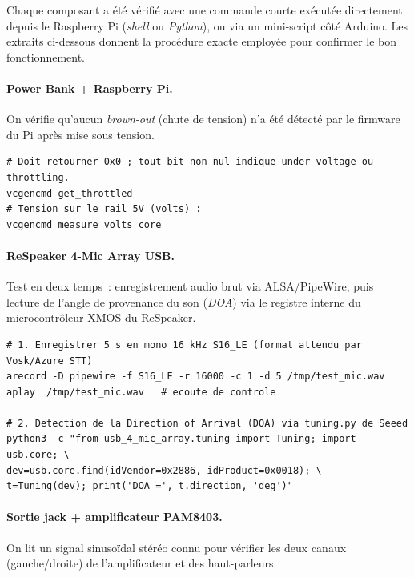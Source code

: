 \documentclass[a4paper,12pt]{report}
\begin{document}
	Chaque composant a été vérifié avec une commande courte exécutée directement
	depuis le Raspberry Pi (\textit{shell} ou \textit{Python}), ou via un mini-script
	côté Arduino. Les extraits ci-dessous donnent la procédure exacte employée pour
	confirmer le bon fonctionnement.

	\paragraph{Power Bank + Raspberry Pi.}
	On vérifie qu'aucun \textit{brown-out} (chute de tension) n'a été détecté par
	le firmware du Pi après mise sous tension.

\begin{lstlisting}[style=kodatest, language=shellkoda, caption={Diagnostic alimentation \texttt{vcgencmd}}]
# Doit retourner 0x0 ; tout bit non nul indique under-voltage ou throttling.
vcgencmd get_throttled
# Tension sur le rail 5V (volts) :
vcgencmd measure_volts core
\end{lstlisting}

	\paragraph{ReSpeaker 4-Mic Array USB.}
	Test en deux temps~: enregistrement audio brut via ALSA/PipeWire, puis lecture
	de l'angle de provenance du son (\textit{DOA}) via le registre interne du
	microcontrôleur XMOS du ReSpeaker.

\begin{lstlisting}[style=kodatest, language=shellkoda, caption={Enregistrement 5\,s et lecture du DOA}]
# 1. Enregistrer 5 s en mono 16 kHz S16_LE (format attendu par Vosk/Azure STT)
arecord -D pipewire -f S16_LE -r 16000 -c 1 -d 5 /tmp/test_mic.wav
aplay  /tmp/test_mic.wav   # ecoute de controle

# 2. Detection de la Direction of Arrival (DOA) via tuning.py de Seeed
python3 -c "from usb_4_mic_array.tuning import Tuning; import usb.core; \
dev=usb.core.find(idVendor=0x2886, idProduct=0x0018); \
t=Tuning(dev); print('DOA =', t.direction, 'deg')"
\end{lstlisting}

	\paragraph{Sortie jack + amplificateur PAM8403.}
	On lit un signal sinusoïdal stéréo connu pour vérifier les deux canaux
	(gauche/droite) de l'amplificateur et des haut-parleurs.
\end{document}
